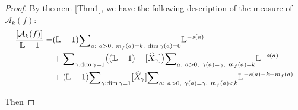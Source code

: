 \documentclass[12pt,a4paper,leqno]{amsart}
\theoremstyle{definition}
\begin{document}
\begin{proof}
By theorem \ref{Thm1}, we have the following description of the
measure of $\mathcal A_k(f)$: 
\begin{align*}
\frac{[\mathcal A_k(f)]}{{\mathbb{L}}-1}
=&
({\mathbb{L}}-1){\mathop{\textrm{\scriptsize $\mathop\sum$}}}_{a:\ a>0,~m_f(a)=k, \ \dim\gamma(a)=0}
{\mathbb{L}}^{-s(a)}\\
&+
{\mathop{\textrm{\scriptsize $\mathop\sum$}}}_{\gamma:\dim\gamma=1}
\bigl(({\mathbb{L}}-1)-[\widehat{X}_{\gamma}]\bigr)
{\mathop{\textrm{\scriptsize $\mathop\sum$}}}_{a:~a>0, ~\gamma(a)=\gamma,~m_f(a)=k}
{\mathbb{L}}^{-s(a)}
\\
&+({\mathbb{L}}-1)
{\mathop{\textrm{\scriptsize $\mathop\sum$}}}_{\gamma:\dim\gamma=1}
[\widehat{X}_{\gamma}]
{\mathop{\textrm{\scriptsize $\mathop\sum$}}}_{a:\ a>0, ~\gamma(a)=\gamma,~m_f(a)<k}
{\mathbb{L}}^{-s(a)-k+m_f(a)}
\end{align*}

Then


\end{proof}
\end{document}
